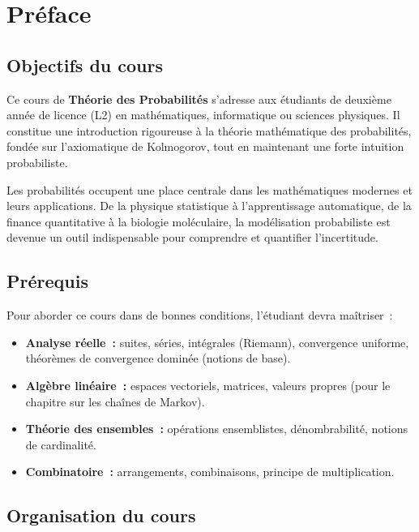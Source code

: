 \chapter*{Pr\'eface}

\section*{Objectifs du cours}

Ce cours de \textbf{Th\'eorie des Probabilit\'es} s'adresse aux \'etudiants de deuxi\`eme
ann\'ee de licence (L2) en math\'ematiques, informatique ou sciences physiques. Il constitue
une introduction rigoureuse \`a la th\'eorie math\'ematique des probabilit\'es, fond\'ee sur
l'axiomatique de Kolmogorov, tout en maintenant une forte intuition probabiliste.

\medskip

Les probabilit\'es occupent une place centrale dans les math\'ematiques modernes et leurs
applications. De la physique statistique \`a l'apprentissage automatique, de la finance
quantitative \`a la biologie mol\'eculaire, la mod\'elisation probabiliste est devenue un
outil indispensable pour comprendre et quantifier l'incertitude.

\section*{Pr\'erequis}

Pour aborder ce cours dans de bonnes conditions, l'\'etudiant devra ma\^itriser~:
\begin{itemize}
    \item \textbf{Analyse r\'eelle~:} suites, s\'eries, int\'egrales (Riemann), convergence
          uniforme, th\'eor\`emes de convergence domin\'ee (notions de base).
    \item \textbf{Alg\`ebre lin\'eaire~:} espaces vectoriels, matrices, valeurs propres
          (pour le chapitre sur les cha\^ines de Markov).
    \item \textbf{Th\'eorie des ensembles~:} op\'erations ensemblistes, d\'enombrabilit\'e,
          notions de cardinalit\'e.
    \item \textbf{Combinatoire~:} arrangements, combinaisons, principe de multiplication.
\end{itemize}

\section*{Organisation du cours}

